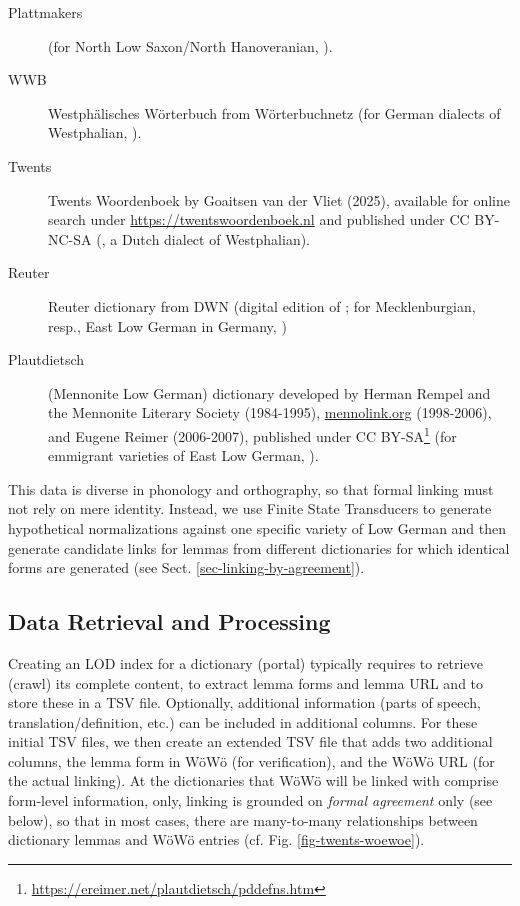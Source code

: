 \begin{description}
\item[Plattmakers] (for North Low Saxon/North Hanoveranian, ).
\item[WWB] Westphälisches Wörterbuch from Wörterbuchnetz (for German dialects of Westphalian, ).
\item[Twents] Twents Woordenboek by Goaitsen van der Vliet (2025), available for online search under \url{https://twentswoordenboek.nl} and published under CC BY-NC-SA (, a Dutch dialect of Westphalian).
\item[Reuter] Reuter dictionary from DWN (digital edition of \cite{muller1904reuter}; for Mecklenburgian, resp., East Low German in Germany, )
\item[Plautdietsch] (Mennonite Low German) dictionary developed by Herman Rempel and the Mennonite Literary Society (1984-1995), \url{mennolink.org} (1998-2006), and Eugene Reimer (2006-2007), published under CC BY-SA\footnote{\url{https://ereimer.net/plautdietsch/pddefns.htm}} (for emmigrant varieties of East Low German, ). 
\end{description}

This data is diverse in phonology and orthography, so that formal linking must not rely on mere identity. Instead, we use Finite State Transducers to generate hypothetical normalizations against one specific variety of Low German and then generate candidate links for lemmas from different dictionaries for which identical forms are generated (see Sect. \ref{sec-linking-by-agreement}).

\subsection{Data Retrieval and Processing}

Creating an LOD index for a dictionary (portal) typically requires to retrieve (crawl) its complete content, to extract lemma forms and lemma URL and to store these in a TSV file. Optionally, additional information (parts of speech, translation/definition, etc.) can be included in additional columns. For these initial TSV files, we then create an extended TSV file that adds two additional columns, the lemma form in WöWö (for verification), and the WöWö URL (for the actual linking). At the dictionaries that WöWö will be linked with comprise form-level information, only, linking is grounded on \emph{formal agreement} only (see below), so that in most cases, there are many-to-many relationships between dictionary lemmas and WöWö entries (cf. Fig. \ref{fig-twents-woewoe}).

